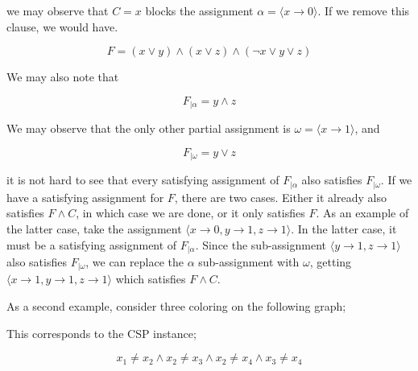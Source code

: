 we may observe that $C = x$ blocks the assignment $\alpha = \langle x \rightarrow 0\rangle$. If we remove this clause, we would have.

\begin{equation}\label{equation:two-sat-example-pt1-2}
    F = (x \lor y) \land (x \lor z) \land (\neg x \lor y \lor z)
\end{equation}

We may also note that

\begin{equation}\label{equation:two-sat-example-pt1-2}
    F_{|\alpha} = y \land z
\end{equation}

We may observe that the only other partial assignment is $\omega = \langle x \rightarrow 1\rangle$, and

\begin{equation}\label{equation:two-sat-example-pt1-2}
    F_{|\omega} = y \lor z
\end{equation}

it is not hard to see that every satisfying assignment of $F_{|\alpha}$ also satisfies $F_{|\omega}$. If we have a satisfying assignment for $F$, there are two cases. Either it already also satisfies $F \wedge C$, in which case we are done, or it only satisfies $F$. As an example of the latter case, take the assignment $\langle x \rightarrow 0, y \rightarrow 1, z \rightarrow 1\rangle$. In the latter case, it must be a satisfying assignment of $F_{|\alpha}$. Since the sub-assignment $\langle y \rightarrow 1, z \rightarrow 1\rangle$ also satisfies $F_{|\omega}$, we can replace the $\alpha$ sub-assignment with $\omega$, getting $\langle x \rightarrow 1, y \rightarrow 1, z \rightarrow 1\rangle$ which satisfies $F \wedge C$.

As a second example, consider three coloring on the following graph;

\begin{center}
\end{center}

This corresponds to the CSP instance;

\begin{equation}
    x_1 \neq x_2 \wedge x_2 \neq x_3 \wedge x_2 \neq x_4\wedge x_3 \neq x_4 
\end{equation}

